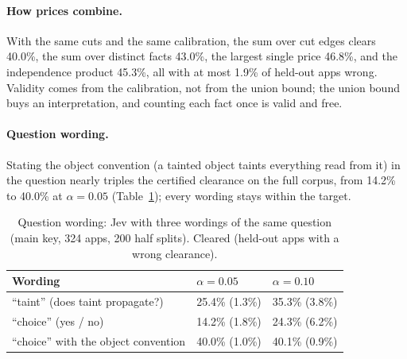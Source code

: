 \paragraph{How prices combine.}
With the same cuts and the same calibration, the sum over cut edges clears 40.0\%, the sum over distinct facts 43.0\%, the largest single price 46.8\%, and the independence product 45.3\%, all with at most 1.9\% of held-out apps wrong.
Validity comes from the calibration, not from the union bound; the union bound buys an interpretation, and counting each fact once is valid and free.
\paragraph{Question wording.}
Stating the object convention (a tainted object taints everything read from it) in the question nearly triples the certified clearance on the full corpus, from 14.2\% to 40.0\% at $\alpha=0.05$ (Table~\ref{tab:wording}); every wording stays within the target.
\begin{table}[t]
\caption{Question wording: Jev with three wordings of the same question (main key, 324 apps, 200 half splits). Cleared (held-out apps with a wrong clearance).}
\label{tab:wording}
\small
\begin{tabular}{@{}lll@{}}
\toprule
Wording & $\alpha=0.05$ & $\alpha=0.10$\\
\midrule
``taint'' (does taint propagate?) & 25.4\% (1.3\%) & 35.3\% (3.8\%)\\
``choice'' (yes / no) & 14.2\% (1.8\%) & 24.3\% (6.2\%)\\
``choice'' with the object convention & 40.0\% (1.0\%) & 40.1\% (0.9\%)\\
\bottomrule
\end{tabular}
\end{table}

